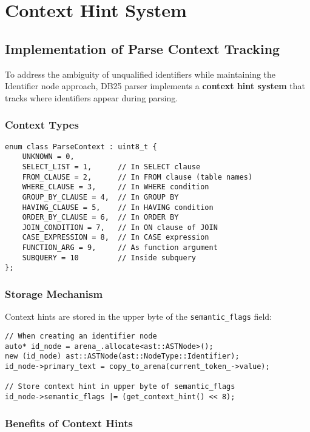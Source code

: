 \documentclass[11pt,a4paper]{article}
\begin{document}
\section{ Context Hint System}

\subsection{Implementation of Parse Context Tracking}

To address the ambiguity of unqualified identifiers while maintaining the Identifier node approach, DB25 parser implements a \textbf{context hint system} that tracks where identifiers appear during parsing.

\subsubsection{Context Types}

\begin{lstlisting}[style=cpp]
enum class ParseContext : uint8_t {
    UNKNOWN = 0,
    SELECT_LIST = 1,      // In SELECT clause
    FROM_CLAUSE = 2,      // In FROM clause (table names)
    WHERE_CLAUSE = 3,     // In WHERE condition
    GROUP_BY_CLAUSE = 4,  // In GROUP BY
    HAVING_CLAUSE = 5,    // In HAVING condition
    ORDER_BY_CLAUSE = 6,  // In ORDER BY
    JOIN_CONDITION = 7,   // In ON clause of JOIN
    CASE_EXPRESSION = 8,  // In CASE expression
    FUNCTION_ARG = 9,     // As function argument
    SUBQUERY = 10         // Inside subquery
};
\end{lstlisting}

\subsubsection{Storage Mechanism}

Context hints are stored in the upper byte of the \texttt{semantic\_flags} field:

\begin{lstlisting}[style=cpp]
// When creating an identifier node
auto* id_node = arena_.allocate<ast::ASTNode>();
new (id_node) ast::ASTNode(ast::NodeType::Identifier);
id_node->primary_text = copy_to_arena(current_token_->value);

// Store context hint in upper byte of semantic_flags
id_node->semantic_flags |= (get_context_hint() << 8);
\end{lstlisting}

\subsubsection{Benefits of Context Hints}
\end{document}
